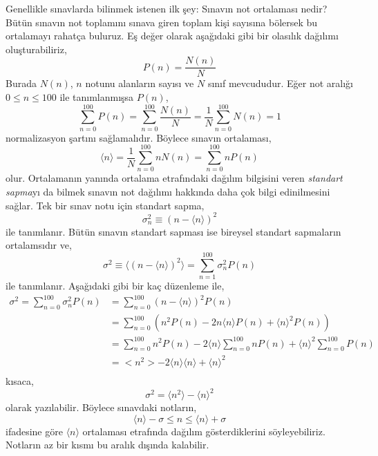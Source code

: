\documentclass[a4paper,12pt, twoside]{article}
\begin{document}
Genellikle sınavlarda bilinmek istenen ilk şey: Sınavın not ortalaması nedir? Bütün sınavın not toplamını sınava giren toplam kişi sayısına bölersek bu ortalamayı rahatça buluruz. Eş değer olarak aşağıdaki gibi bir olasılık dağılımı oluşturabiliriz,
\begin{equation}
P\left( n\right) =\dfrac {N(n) }{N}
\label{eq:probability_distrubition_P}
\end{equation}
Burada $N(n)$, $n$ notunu alanların sayısı ve $N$ sınıf mevcududur. Eğer not aralığı $0\leq n \leq 100$ ile tanımlanmışsa $P(n)$,
\begin{equation}
\sum ^{100}_{n=0}P\left( n\right) =\sum ^{100}_{n=0}\dfrac {N(n) }{N}=\dfrac {1}{N}\sum ^{100}_{n=0}N(n) =1
\label{eq:normalization_P}
\end{equation}
normalizasyon şartını sağlamalıdır. Böylece sınavın ortalaması,
\begin{equation}
\langle n \rangle =\dfrac {1}{N}\sum ^{100}_{n=0}nN\left( n\right) =\sum ^{100}_{n=0}nP\left( n\right) 
\label{eq:average_grade}
\end{equation}
olur. Ortalamanın yanında ortalama etrafındaki dağılım bilgisini veren \emph{standart sapma}yı da bilmek sınavın not dağılımı hakkında daha çok bilgi edinilmesini sağlar. Tek bir sınav notu için standart sapma,
\begin{equation}
\sigma ^{2}_{n}\equiv(n-\langle n\rangle) ^{2}
\label{eq:standard_deviation_atom}
\end{equation}
ile tanımlanır. Bütün sınavın standart sapması ise bireysel standart sapmaların ortalamsıdır ve,
\begin{equation}
\sigma ^{2}\equiv \langle \left( n-\langle n\rangle \right) ^{2}\rangle =\sum ^{100}_{n=1}\sigma _{n}^2P\left( n\right) 
\label{eq:standard_deviation_exam}
\end{equation}
ile tanımlanır. Aşağıdaki gibi bir kaç düzenleme ile,
\begin{align*}
\sigma ^{2}=\sum ^{100}_{n=0}\sigma ^{2}_{n}P\left( n\right) &=\sum ^{100}_{n=0}\left(n -\langle n\rangle \right) ^{2}P\left( n\right) \\
&=\sum ^{100}_{n=0}\left( n^{2}P\left( n\right) -2n\langle n\rangle P\left( n\right) +\langle n\rangle ^{2}P\left( n\right) \right)\\
&=\sum ^{100}_{n=0}n^{2}P\left( n\right) -2 \langle n \rangle\sum ^{100}_{n=0}nP\left( n\right) +\langle n\rangle ^{2}\sum ^{100}_{n=0}P\left( n\right) \\
&=<n^{2}>-2 \langle n \rangle\langle n\rangle +\langle n\rangle ^{2}\\
\end{align*}
kısaca,
\begin{equation}
\sigma^2 = \langle n^{2}\rangle - \langle n \rangle^{2}
\end{equation}
olarak yazılabilir. Böylece sınavdaki notların,
\begin{equation*}
\langle n \rangle - \sigma \leq n \leq \langle n \rangle + \sigma
\end{equation*}
ifadesine göre $\langle n \rangle$ ortalaması etrafında dağılım gösterdiklerini söyleyebiliriz. Notların az bir kısmı bu aralık dışında kalabilir.
\end{document}
